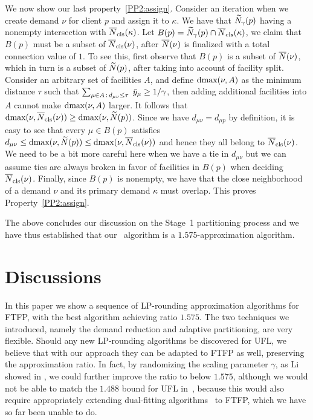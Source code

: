 \documentclass[11pt]{article}
\begin{document}
We now show our last property~\ref{PP2:assign}. Consider an
iteration when we create demand $\nu$ for client $p$ and
assign it to $\kappa$. We have that ${\widetilde N}_{\gamma}(p)$
having a nonempty intersection with
${\overline{N}}_{\text{cls}}(\kappa)$. Let $B(p)={\widetilde N}_{\gamma}(p)\cap
{\overline{N}}_{\text{cls}}(\kappa)$, we claim that $B(p)$ must be a subset
of ${\overline{N}}_{\text{cls}}(\nu)$, after ${\overline{N}}(\nu)$ is finalized with
a total connection value of $1$. To see this, first observe
that $B(p)$ is a subset of ${\overline{N}}(\nu)$, which in turn is a
subset of ${\widetilde N}(p)$, after taking into account of
facility split. Consider an arbitrary set of facilities $A$,
and define $\text{dmax}(\nu, A)$ as the minimum distance $\tau$
such that $\sum_{\mu\in A {\,:\,} d_{\mu\nu} \leq
  \tau}\;{\bar y}_{\mu} \geq 1/\gamma$, then adding additional
facilities into $A$ cannot make $\text{dmax}(\nu, A)$ larger. It
follows that $\text{dmax}(\nu, {\overline{N}}_{\text{cls}}(\nu)) \geq \text{dmax}(\nu,
{\widetilde N}(p))$. Since we have $d_{\mu \nu} = d_{\mu p}$ by
definition, it is easy to see that every $\mu \in B(p)$
satisfies $d_{\mu \nu} \leq \text{dmax}(\nu, {\widetilde N}(p)) \leq
\text{dmax}(\nu, {\overline{N}}_{\text{cls}}(\nu))$ and hence they all belong to
${\overline{N}}_{\text{cls}}(\nu)$. We need to be a bit more careful here
when we have a tie in $d_{\mu\nu}$ but we can assume ties
are always broken in favor of facilities in $B(p)$ when
deciding ${\overline{N}}_{\text{cls}}(\nu)$. Finally, since $B(p)$ is
nonempty, we have that the close neighborhood of a demand
$\nu$ and its primary demand $\kappa$ must overlap. This
proves Property~\ref{PP2:assign}.

The above concludes our discussion on the Stage~1
partitioning process and we have thus established that
our~{\EBGS} algorithm is a $1.575$-approximation algorithm.



\section{Discussions}

In this paper we show a sequence of LP-rounding approximation algorithms
for FTFP, with the best algorithm achieving  ratio $1.575$. The two techniques we introduced,
namely the demand reduction and adaptive partitioning, are very flexible. Should any new
LP-rounding algorithms be discovered for UFL, we believe that with our approach they can be
adapted to FTFP as well, preserving the approximation ratio. In fact, by randomizing the
scaling parameter $\gamma$, as Li showed in \cite{Li11}, we
could further improve the ratio to below $1.575$, although we would not be
able to match the $1.488$ bound for UFL in~\cite{Li11}, because this would
also require appropriately extending dual-fitting algorithms~\cite{MahdianYZ06}
to FTFP, which we have so far been unable to do.
\end{document}
